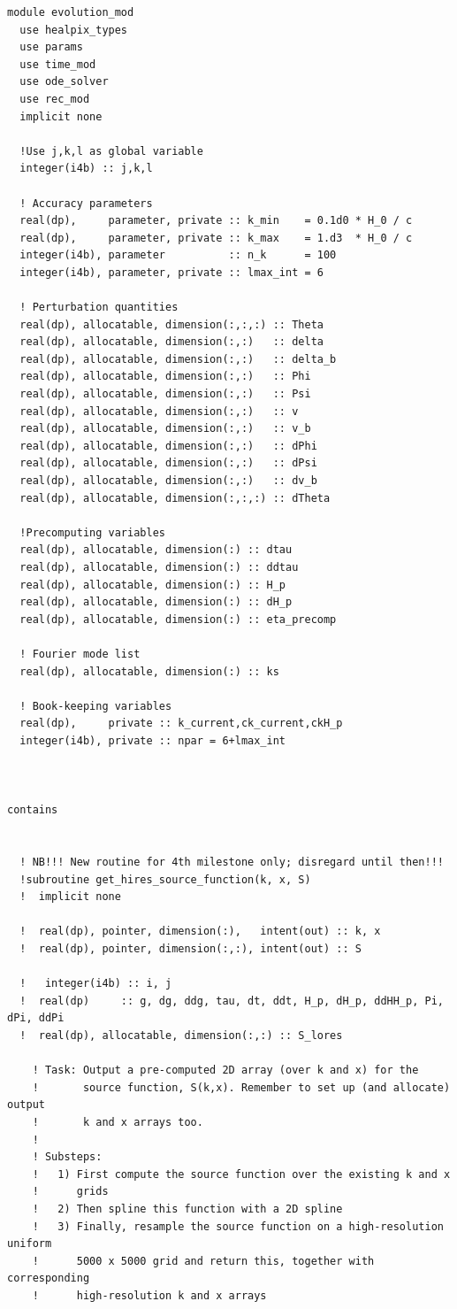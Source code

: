\documentclass[a4paper]{report}
\begin{document}
\begin{verbatim}
module evolution_mod
  use healpix_types
  use params
  use time_mod
  use ode_solver
  use rec_mod
  implicit none

  !Use j,k,l as global variable
  integer(i4b) :: j,k,l

  ! Accuracy parameters
  real(dp),     parameter, private :: k_min    = 0.1d0 * H_0 / c
  real(dp),     parameter, private :: k_max    = 1.d3  * H_0 / c
  integer(i4b), parameter          :: n_k      = 100
  integer(i4b), parameter, private :: lmax_int = 6

  ! Perturbation quantities
  real(dp), allocatable, dimension(:,:,:) :: Theta
  real(dp), allocatable, dimension(:,:)   :: delta
  real(dp), allocatable, dimension(:,:)   :: delta_b
  real(dp), allocatable, dimension(:,:)   :: Phi
  real(dp), allocatable, dimension(:,:)   :: Psi
  real(dp), allocatable, dimension(:,:)   :: v
  real(dp), allocatable, dimension(:,:)   :: v_b
  real(dp), allocatable, dimension(:,:)   :: dPhi
  real(dp), allocatable, dimension(:,:)   :: dPsi
  real(dp), allocatable, dimension(:,:)   :: dv_b
  real(dp), allocatable, dimension(:,:,:) :: dTheta

  !Precomputing variables
  real(dp), allocatable, dimension(:) :: dtau
  real(dp), allocatable, dimension(:) :: ddtau
  real(dp), allocatable, dimension(:) :: H_p
  real(dp), allocatable, dimension(:) :: dH_p
  real(dp), allocatable, dimension(:) :: eta_precomp

  ! Fourier mode list
  real(dp), allocatable, dimension(:) :: ks

  ! Book-keeping variables
  real(dp),     private :: k_current,ck_current,ckH_p
  integer(i4b), private :: npar = 6+lmax_int

 

contains


  ! NB!!! New routine for 4th milestone only; disregard until then!!!
  !subroutine get_hires_source_function(k, x, S)
  !  implicit none

  !  real(dp), pointer, dimension(:),   intent(out) :: k, x
  !  real(dp), pointer, dimension(:,:), intent(out) :: S

  !   integer(i4b) :: i, j
  !  real(dp)     :: g, dg, ddg, tau, dt, ddt, H_p, dH_p, ddHH_p, Pi, dPi, ddPi
  !  real(dp), allocatable, dimension(:,:) :: S_lores

    ! Task: Output a pre-computed 2D array (over k and x) for the 
    !       source function, S(k,x). Remember to set up (and allocate) output 
    !       k and x arrays too. 
    !
    ! Substeps:
    !   1) First compute the source function over the existing k and x
    !      grids
    !   2) Then spline this function with a 2D spline
    !   3) Finally, resample the source function on a high-resolution uniform
    !      5000 x 5000 grid and return this, together with corresponding
    !      high-resolution k and x arrays


\end{verbatim}
\end{document}
